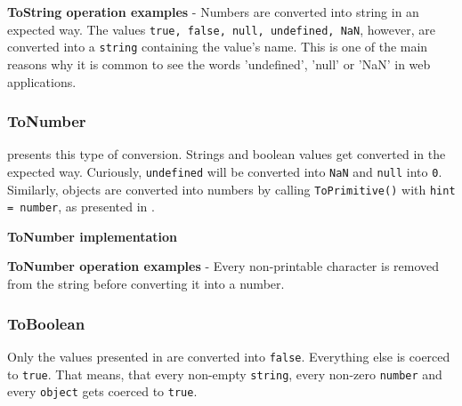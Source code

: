 \begin{code}
	\captionsetup{aboveskip=0pt, belowskip=10pt}
	\caption[ToString operation examples]{\textbf{ToString operation examples} - Numbers are converted into string in an expected way. The values \texttt{true, false, null, undefined, NaN}, however, are converted into a \texttt{string} containing the value's name. This is one of the main reasons why it is common to see the words 'undefined', 'null' or 'NaN' in web applications.}
	\label{code:background-to-string-operation}
\end{code}

\subsubsection{ToNumber}
 presents this type of conversion. Strings and boolean values get converted in the expected way. Curiously, \texttt{undefined} will be converted into \texttt{NaN} and \texttt{null} into \texttt{0}. Similarly, objects are converted into numbers by calling \texttt{ToPrimitive()} with \texttt{hint = number}, as presented in .

\begin{code}
	\captionsetup{aboveskip=0pt, belowskip=10pt}
	\caption[ToNumber implementation]{\textbf{ToNumber implementation}}
	\label{code:background-to-number-implementation}
\end{code}

\begin{code}
	\captionsetup{aboveskip=0pt, belowskip=10pt}
	\caption[ToNumber operation examples]{\textbf{ToNumber operation examples} - Every non-printable character is removed from the string before converting it into a number.}
	\label{code:background-to-number-operation}
\end{code}


\subsubsection{ToBoolean}
Only the values presented in  are converted into \texttt{false}. Everything else is coerced to \texttt{true}. That means, that every non-empty \texttt{string}, every non-zero \texttt{number} and every \texttt{object} gets coerced to \texttt{true}.

